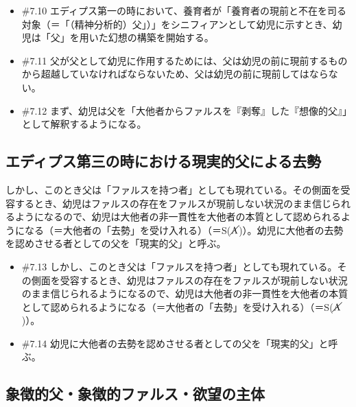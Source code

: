 \begin{note}{}
  \begin{itemize}
    \tightlist
    \item{\#7.10}
      エディプス第一の時において、養育者が「養育者の現前と不在を司る対象（＝「（精神分析的）父」）」をシニフィアンとして幼児に示すとき、幼児は「父」を用いた幻想の構築を開始する。
    \item{\#7.11}
      父が父として幼児に作用するためには、父は幼児の前に現前するものから超越していなければならないため、父は幼児の前に現前してはならない。
    \item{\#7.12}
      まず、幼児は父を「大他者からファルスを『剥奪』した『想像的父』」として解釈するようになる。
  \end{itemize}
\end{note}

\subsection{エディプス第三の時における現実的父による去勢}\label{ux30a8ux30c7ux30a3ux30d7ux30b9ux7b2cux4e09ux306eux6642ux306bux304aux3051ux308bux73feux5b9fux7684ux7236ux306bux3088ux308bux53bbux52e2}

しかし、このとき父は「ファルスを持つ者」としても現れている。その側面を受容するとき、幼児はファルスの存在をファルスが現前しない状況のまま信じられるようになるので、幼児は大他者の非一貫性を大他者の本質として認められるようになる（＝大他者の「去勢」を受け入れる）（＝S(\(\cancel{\textrm{A}}\))）。幼児に大他者の去勢を認めさせる者としての父を「現実的父」と呼ぶ。

\begin{note}{}
  \begin{itemize}
    \tightlist
    \item{\#7.13}
      しかし、このとき父は「ファルスを持つ者」としても現れている。その側面を受容するとき、幼児はファルスの存在をファルスが現前しない状況のまま信じられるようになるので、幼児は大他者の非一貫性を大他者の本質として認められるようになる（＝大他者の「去勢」を受け入れる）（＝S($\cancel{\textrm{A}}$)）。
    \item{\#7.14}
      幼児に大他者の去勢を認めさせる者としての父を「現実的父」と呼ぶ。
  \end{itemize}
\end{note}

\subsection{象徴的父・象徴的ファルス・欲望の主体}\label{ux8c61ux5fb4ux7684ux7236ux8c61ux5fb4ux7684ux30d5ux30a1ux30ebux30b9ux6b32ux671bux306eux4e3bux4f53}


